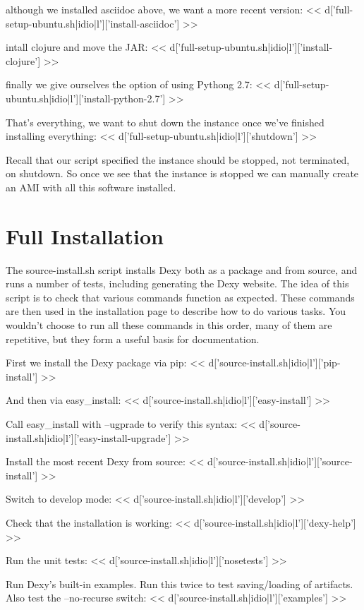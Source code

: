 \documentclass{tufte-handout}
\begin{document}
although we installed asciidoc above, we want a more recent version:
<< d['full-setup-ubuntu.sh|idio|l']['install-asciidoc'] >>

intall clojure and move the JAR:
<< d['full-setup-ubuntu.sh|idio|l']['install-clojure'] >>

finally we give ourselves the option of using Pythong 2.7:
<< d['full-setup-ubuntu.sh|idio|l']['install-python-2.7'] >>

That's everything, we want to shut down the instance once we've finished installing everything:
<< d['full-setup-ubuntu.sh|idio|l']['shutdown'] >>

Recall that our script specified the instance should be stopped, not terminated, on shutdown. So once we see that the instance is stopped we can manually create an AMI with all this software installed.

\section{Full Installation}

The source-install.sh script installs Dexy both as a package and from source, and runs a number of tests, including generating the Dexy website. The idea of this script is to check that various commands function as expected. These commands are then used in the installation page to describe how to do various tasks. You wouldn't choose to run all these commands in this order, many of them are repetitive, but they form a useful basis for documentation.

First we install the Dexy package via pip:
<< d['source-install.sh|idio|l']['pip-install'] >>

And then via easy\_install:
<< d['source-install.sh|idio|l']['easy-install'] >>

Call easy\_install with --ugprade to verify this syntax:
<< d['source-install.sh|idio|l']['easy-install-upgrade'] >>

Install the most recent Dexy from source:
<< d['source-install.sh|idio|l']['source-install'] >>

Switch to develop mode:
<< d['source-install.sh|idio|l']['develop'] >>

Check that the installation is working:
<< d['source-install.sh|idio|l']['dexy-help'] >>

Run the unit tests:
<< d['source-install.sh|idio|l']['nosetests'] >>

Run Dexy's built-in examples. Run this twice to test saving/loading of artifacts. Also test the --no-recurse switch:
<< d['source-install.sh|idio|l']['examples'] >>
\end{document}

